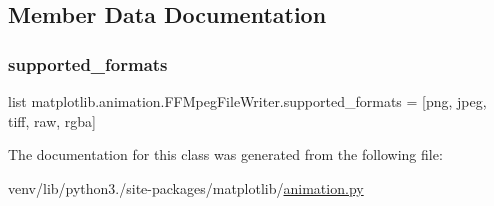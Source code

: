 \subsection{Member Data Documentation}
\mbox{\label{classmatplotlib_1_1animation_1_1FFMpegFileWriter_a03fdb1c87983f375fc5b18f3acf3dd62}} 
\subsubsection{\texorpdfstring{supported\+\_\+formats}{supported\_formats}}
{\footnotesize\ttfamily list matplotlib.\+animation.\+F\+F\+Mpeg\+File\+Writer.\+supported\+\_\+formats = \mbox{[}\textquotesingle{}png\textquotesingle{}, \textquotesingle{}jpeg\textquotesingle{}, \textquotesingle{}tiff\textquotesingle{}, \textquotesingle{}raw\textquotesingle{}, \textquotesingle{}rgba\textquotesingle{}\mbox{]}\hspace{0.3cm}{\ttfamily [static]}}



The documentation for this class was generated from the following file\+:\begin{DoxyCompactItemize}
\item 
venv/lib/python3./site-\/packages/matplotlib/\hyperlink{animation_8py}{animation.\+py}\end{DoxyCompactItemize}
